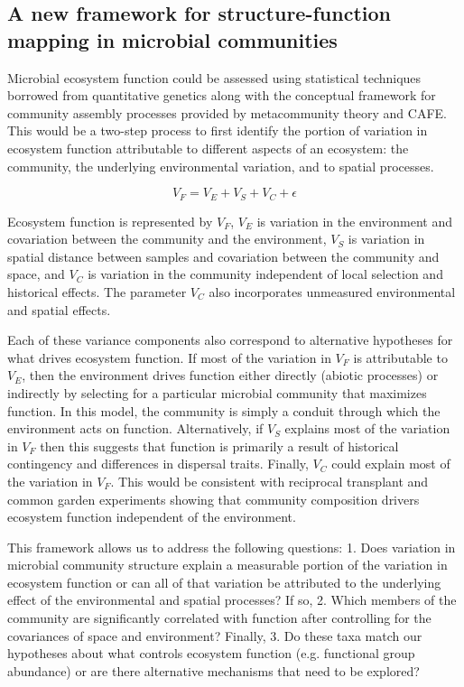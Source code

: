 \documentclass{article}
\begin{document}
\subsection{A new framework for structure-function mapping in microbial
communities}

Microbial ecosystem function could be assessed using statistical techniques
borrowed from quantitative genetics along with the conceptual framework for
community assembly processes provided by metacommunity theory and CAFE. This
would be a two-step process to first identify the portion of variation in
ecosystem function attributable to different aspects of an ecosystem: the
community, the underlying environmental variation, and to spatial processes.

\begin{equation}
V_F=V_E+V_S+V_C+\epsilon
\end{equation}

Ecosystem function is represented by $V_F$, $V_E$ is variation in the
environment and covariation between the community and the environment, $V_S$ is
variation in spatial distance between samples and covariation between the
community and space, and $V_C$ is variation in the community independent of
local selection and historical effects. The parameter $V_C$ also incorporates
unmeasured environmental and spatial effects. 

Each of these variance components also correspond to alternative hypotheses for
what drives ecosystem function. If most of the variation in $V_F$ is
attributable to $V_E$, then the environment drives function either directly
(abiotic processes) or indirectly by selecting for a particular microbial
community that maximizes function. In this model, the community is simply a 
conduit through which the environment acts on function. Alternatively, if $V_S$
explains most of the variation in $V_F$ then this suggests that function is
primarily a result of historical contingency and differences in dispersal traits.
Finally, $V_C$ could explain most of the variation in $V_F$. This would be
consistent with reciprocal transplant and common garden experiments showing that
community composition drivers ecosystem function independent of the environment.

This framework allows us to address the following questions: 1. Does variation
in microbial community structure explain a measurable portion of the variation in
ecosystem function or can all of that variation be attributed to the underlying
effect of the environmental and spatial processes? If so, 2. Which members of
the community are significantly correlated with function after controlling for
the covariances of space and environment? Finally, 3. Do these taxa match our hypotheses about
what controls ecosystem function (e.g. functional group abundance) or are there
alternative mechanisms that need to be explored?
\end{document}

